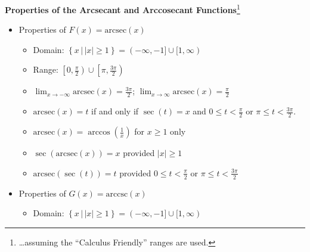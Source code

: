 \documentclass{ximera}
\begin{document}
\begin{theorem} \label{arcsecantcosecantfunctionprops2}  \textbf{Properties of the Arcsecant and Arccosecant Functions}\footnote{\ldots assuming the ``Calculus Friendly'' ranges are used.}  

\begin{itemize}

\item Properties of $F(x)= \text{arcsec}(x)$  

\begin{itemize}

\item Domain: $\left\{ x \, | \,  |x| \geq 1 \right\} = (-\infty, -1] \cup [1,\infty)$

\item Range: $\left[0, \frac{\pi}{2} \right) \cup \left[\pi, \frac{3\pi}{2} \right)$

\item   $\lim_{x \rightarrow -\infty} \text{arcsec}(x) = \frac{3\pi}{2}$; $\lim_{x \rightarrow \infty} \text{arcsec}(x) =\frac{\pi}{2}$ 
\item  $\text{arcsec}(x) = t$ if and only if $\sec(t) = x$ and $0 \leq t < \frac{\pi}{2}$ or $ \pi \leq  t < \frac{3\pi}{2}$.

\item  $\text{arcsec}(x) = \arccos\left(\frac{1}{x}\right)$ for $x \geq 1$ only %

\item  $\sec\left(\text{arcsec}(x)\right) = x$ provided $|x| \geq 1$

\item  $\text{arcsec}(\sec(t)) = t$ provided $0 \leq t < \frac{\pi}{2}$ or $ \pi \leq  t < \frac{3\pi}{2}$


\end{itemize}

\item Properties of $G(x) = \text{arccsc}(x)$  

\begin{itemize}

\item Domain: $\left\{ x \, | \,  |x| \geq 1 \right\} = (-\infty, -1] \cup [1,\infty)$


\end{itemize}
\end{itemize}
\end{theorem}
\end{document}
